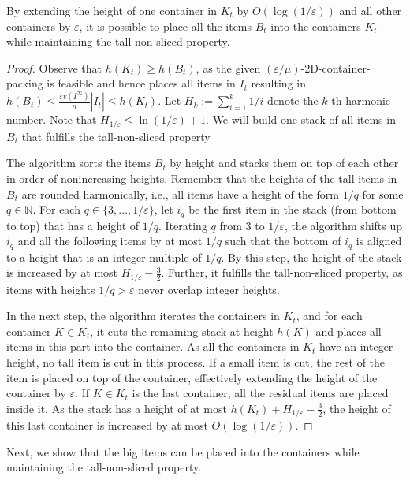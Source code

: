 \documentclass[a4paper,UKenglish,cleveref, autoref, thm-restate]{lipics-v2021}
\newcommand{\eps}{\varepsilon}
\newcommand{\bigy}{big\xspace}
\begin{document}
\begin{lemma}
\label{lem:placing-big-items-second-step}
By extending the height of one container in $K_t$ by $O(\log(1/\eps))$ and all other containers by $\eps$, it is possible to place all the items $B_t$ into the containers $K_t$ while maintaining the tall-non-sliced property.
\end{lemma}
\begin{proof}
Observe that $h(K_t) \geq h(B_t)$, as the given $(\eps/\mu)$-2D-container-packing is feasible and hence places all items in $I_t$ resulting in $h(B_t) \leq \frac{\eps v(I^{\infty})}{n} |\tilde{I}_t| \leq h(K_t)$.
Let $H_{k}:=\sum_{i=1}^{k}1/i$ denote the $k$-th harmonic number.
Note that $H_{1/\eps} \leq \ln(1/\eps)+1$.
We will build one stack of all items in $B_t$ that fulfills the tall-non-sliced property

The algorithm sorts the items $B_t$ by height and stacks them on top of each other in order of nonincreasing heights. 
Remember that the heights of the tall items in $B_t$ are rounded harmonically, i.e., all items have a height of the form $1/q$ for some $q \in \mathbb{N}$.
For each $q \in \{3,\dots,1/\eps\}$, let $i_q$ be the first item in the stack (from bottom to top) that has a height of $1/q$.
Iterating $q$ from $3$ to $1/\eps$, the algorithm shifts up $i_q$ and all the following items by at most $1/q$ such that the bottom of $i_q$ is aligned to a height that is an integer multiple of $1/q$.
By this step, the height of the stack is increased by at most $H_{1/\eps}-\frac{3}{2}$.
Further, it fulfills the tall-non-sliced property, as items with heights $1/q > \eps$ never overlap integer heights.

In the next step, the algorithm iterates the containers in $K_t$, and for each container $K \in K_t$, it cuts the remaining stack at height $h(K)$ and places all items in this part into the container.  
As all the containers in $K_t$ have an integer height, no tall item is cut in this process. 
If a small item is cut, the rest of the item is placed on top of the container, effectively extending the height of the container by $\eps$.
If $K \in K_t$ is the last container, all the residual items are placed inside it. As the stack has a height of at most $h(K_t) + H_{1/\eps}-\frac{3}{2}$, the height of this last container is increased by at most $O(\log(1/\eps))$.
\end{proof}

Next, we show that the \bigy items can be placed into the containers while maintaining the tall-non-sliced property.
\end{document}
